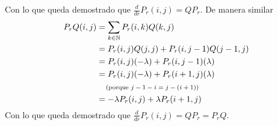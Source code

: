 Con lo que queda demostrado que $\frac{d}{dr}P_r(i,j) = QP_r$. De manera similar
\begin{align}
    P_rQ(i,j)   &=  \sum_{k \in \mathbb{N}} P_r(i,k)Q(k,j)                  \\
                &=  P_r(i,j)Q(j,j)  +   P_r(i,j-1)Q(j-1,j)          \\
                &=  P_r(i,j)(-\lambda)  +   P_r(i,j-1)(\lambda)     \\
                &=  P_r(i,j)(-\lambda)  +   P_r(i+1,j)(\lambda)     \\
                &\;\;\;\;\mbox{{\scriptsize(porque $j-1-i = j-(i+1)$)}}                 \\
                &=  -\lambda P_r(i,j)  +   \lambda P_r(i+1,j)
\end{align}\pn
Con lo que queda demostrado que $\frac{d}{dr} P_r(i,j) = QP_r = P_rQ$.